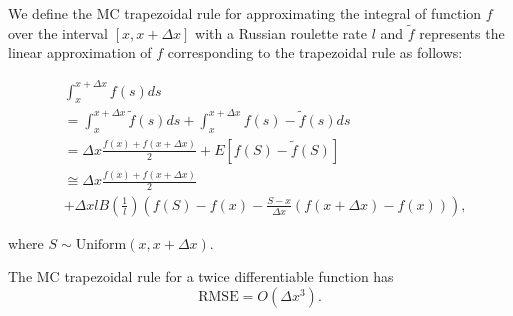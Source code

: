 \documentclass[a4paper,12pt]{article}
\begin{document}
\begin{definition}
    We define the MC trapezoidal rule for approximating the integral
    of function $f$ over the interval $[x, x+\Delta x]$ with a Russian roulette rate
    $l$ and $\tilde{f}$ represents the linear approximation of $f$ corresponding
    to the trapezoidal rule as follows:

    \begin{align}
         & \int_{x}^{x+\Delta x} f(s) ds                           \\
         & = \int_{x}^{x+\Delta x}  \tilde{f}(s) ds +
        \int_{x}^{x+\Delta x}  f(s) - \tilde{f}(s) ds              \\
         & = \Delta x \frac{f(x) + f(x+\Delta x)}{2}
        + E \left[f(S) - \tilde{f}(S)\right]                       \\
         & \cong \Delta x \frac{f(x) + f(x+\Delta x)}{2} \nonumber \\
         & + \Delta x l B\left( \frac{1}{l}\right)
        \left(f(S) - f(x) - \frac{S - x}{\Delta x}
        \left(f(x+\Delta x) - f(x)\right) \right), \label{eq:MCtrap}
    \end{align}

    where $S \sim \text{Uniform}(x,x+\Delta x)$.
\end{definition}

\begin{lemma} \label{lem:rmse mctrap}
    The MC trapezoidal rule
    for a twice differentiable function has
    \begin{equation}
        \text{RMSE} =O\left( \Delta x^{3} \right) .
    \end{equation}
\end{lemma}
\end{document}
